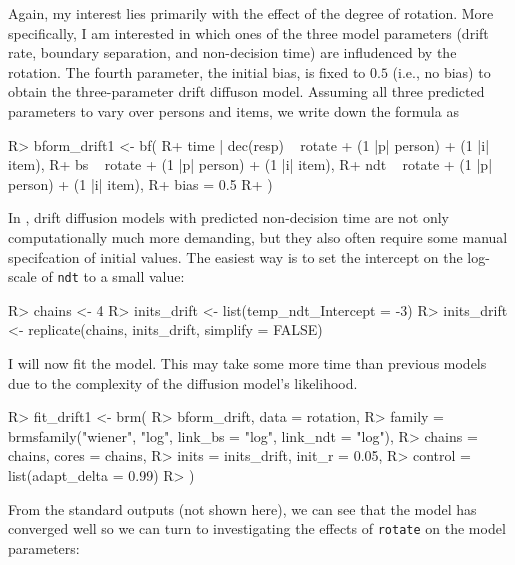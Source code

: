 \documentclass[jss]{jss}
\begin{document}
Again, my interest lies primarily with the effect of the degree of
rotation. More specifically, I am interested in which ones of the three
model parameters (drift rate, boundary separation, and non-decision
time) are infludenced by the rotation. The fourth parameter, the initial
bias, is fixed to \(0.5\) (i.e., no bias) to obtain the three-parameter
drift diffuson model. Assuming all three predicted parameters to vary
over persons and items, we write down the formula as

\begin{CodeChunk}

\begin{CodeInput}
R> bform_drift1 <- bf(
R+   time | dec(resp) ~ rotate + (1 |p| person) + (1 |i| item),
R+   bs ~ rotate + (1 |p| person) + (1 |i| item),
R+   ndt ~ rotate + (1 |p| person) + (1 |i| item),
R+   bias = 0.5
R+ )
\end{CodeInput}
\end{CodeChunk}

In , drift diffusion models with predicted non-decision
time are not only computationally much more demanding, but they also
often require some manual specifcation of initial values. The easiest
way is to set the intercept on the log-scale of \texttt{ndt} to a small
value:

\begin{CodeChunk}

\begin{CodeInput}
R> chains <- 4
R> inits_drift <- list(temp_ndt_Intercept = -3)
R> inits_drift <- replicate(chains, inits_drift, simplify = FALSE)
\end{CodeInput}
\end{CodeChunk}

I will now fit the model. This may take some more time than previous
models due to the complexity of the diffusion model's likelihood.

\begin{CodeChunk}

\begin{CodeInput}
R> fit_drift1 <- brm(
R>   bform_drift, data = rotation, 
R>   family = brmsfamily("wiener", "log", link_bs = "log", link_ndt = "log"),
R>   chains = chains, cores = chains,
R>   inits = inits_drift, init_r = 0.05,
R>   control = list(adapt_delta = 0.99)
R> )
\end{CodeInput}
\end{CodeChunk}

From the standard outputs (not shown here), we can see that the model
has converged well so we can turn to investigating the effects of
\texttt{rotate} on the model parameters:
\end{document}
